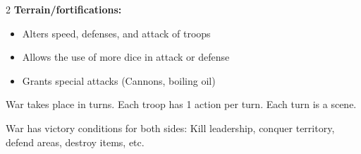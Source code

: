 \begin{multicols}{2}
\textbf{Terrain/fortifications:}

\begin{itemize}
    \setlength\itemsep{0em}
    \setlength{\parskip}{0em}
    \item Alters speed, defenses, and attack of troops
    \item Allows the use of more dice in attack or defense
    \item Grants special attacks (Cannons, boiling oil)
\end{itemize}

War takes place in turns. Each troop has 1 action per turn. Each turn is a scene.

War has victory conditions for both sides: Kill leadership, conquer territory, defend areas, destroy items, etc.

\end{multicols}